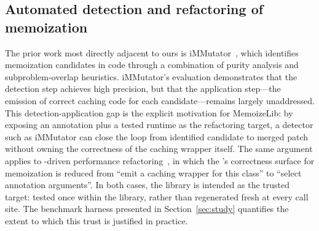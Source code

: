 \subsection{Automated detection and refactoring of memoization}

The prior work most directly adjacent to ours is iMMutator~\cite{immutator}, which identifies memoization candidates in \jvm code through a combination of purity analysis and subproblem-overlap heuristics. iMMutator's evaluation demonstrates that the detection step achieves high precision, but that the application step---the emission of correct caching code for each candidate---remains largely unaddressed. This detection-application gap is the explicit motivation for MemoizeLib: by exposing an annotation plus a tested runtime as the refactoring target, a detector such as iMMutator can close the loop from identified candidate to merged patch without owning the correctness of the caching wrapper itself. The same argument applies to \llm-driven performance refactoring~\cite{llm_refactoring,hall_costa}, in which the \llm's correctness surface for memoization is reduced from ``emit a caching wrapper for this class'' to ``select annotation arguments''. In both cases, the library is intended as the trusted target: tested once within the library, rather than regenerated fresh at every call site. The benchmark harness presented in Section~\ref{sec:study} quantifies the extent to which this trust is justified in practice.

